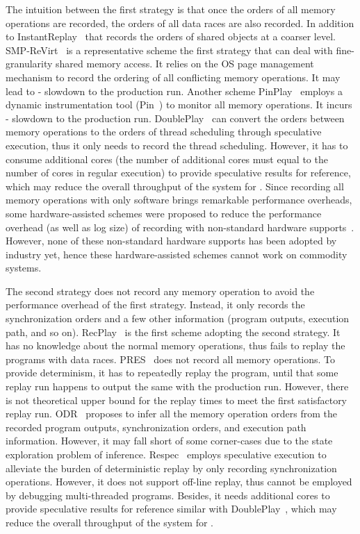 \documentclass[10pt,onecolumn,letterpaper]{article}
\begin{document}
The intuition between the first strategy is that once the orders of
all memory operations are recorded, the orders of all data races are
also recorded. In addition to InstantReplay~\cite{LeBlanc87TC} that
records the orders of shared objects at a coarser level.
SMP-ReVirt~\cite{Dunlap08VEE} is a representative scheme the first
strategy that can deal with fine-granularity shared memory access.
It relies on the OS page management mechanism to record the ordering
of all conflicting memory operations. It may lead to -
slowdown to the production run. Another scheme
PinPlay~\cite{Patil10CGO} employs a dynamic instrumentation tool
(Pin~\cite{Luk05PLDI}) to monitor all memory operations. It incurs
- slowdown to the production run.
DoublePlay~\cite{Veeraraghavan11ASPLOS} can convert the orders
between memory operations to the orders of thread scheduling through
speculative execution, thus it only needs to record the thread
scheduling. However, it has to consume additional cores (the number
of additional cores must equal to the number of cores in regular
execution) to provide speculative results for reference, which may
reduce the overall throughput of the system for . Since
recording all memory operations with only software brings remarkable
performance overheads, some hardware-assisted schemes were proposed
to reduce the performance overhead (as well as log size) of
recording with non-standard hardware
supports~\cite{Xu03ISCA,Hower08ISCA,Montesinos08ISCA,Voskuilen10ISCA}.
However, none of these non-standard hardware supports has been
adopted by industry yet, hence these hardware-assisted schemes
cannot work on commodity systems.


The second strategy does not record any memory operation to avoid
the performance overhead of the first strategy. Instead, it only
records the synchronization orders and a few other information
(program outputs, execution path, and so on).
RecPlay~\cite{Ronsse99TCS} is the first scheme adopting the second
strategy. It has no knowledge about the normal memory operations,
thus fails to replay the programs with data races.
PRES~\cite{Park09SOSP} does not record all memory operations. To
provide determinism, it has to repeatedly replay the program, until
that some replay run happens to output the same with the production
run. However, there is not theoretical upper bound for the replay
times to meet the first satisfactory replay run.
ODR~\cite{Altekar09SOSP} proposes to infer all the memory operation
orders from the recorded program outputs, synchronization orders,
and execution path information. However, it may fall short of some
corner-cases due to the state exploration problem of inference.
Respec~\cite{Lee10ASPLOS} employs speculative execution to alleviate
the burden of deterministic replay by only recording synchronization
operations. However, it does not support off-line replay, thus
cannot be employed by debugging multi-threaded programs. Besides, it
needs additional cores to provide speculative results for reference
similar with DoublePlay~\cite{Veeraraghavan11ASPLOS}, which may
reduce the overall throughput of the system for .
\end{document}
